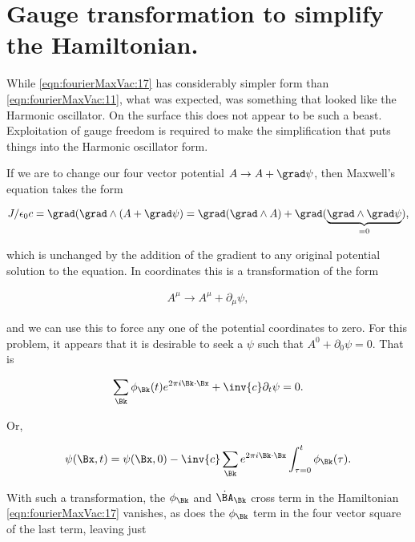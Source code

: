 \section{Gauge transformation to simplify the Hamiltonian.}

While \autoref{eqn:fourierMaxVac:17} has considerably simpler form than \autoref{eqn:fourierMaxVac:11}, what was expected, was something that looked like the Harmonic oscillator.  On the surface this does not appear to be such a beast.  Exploitation of gauge freedom is required to make the simplification that puts things into the Harmonic oscillator form.

If we are to change our four vector potential $A \rightarrow A + \grad \psi$, then Maxwell's equation takes the form

\begin{align}\label{eqn:fourierMaxVac:30}
J/\epsilon_0 c = \grad (\grad \wedge (A + \grad \psi) = \grad (\grad \wedge A) + \grad (\underbrace{\grad \wedge \grad \psi}_{=0}),
\end{align}

which is unchanged by the addition of the gradient to any original potential solution to the equation.  In coordinates this is a transformation of the form

\begin{align}\label{eqn:fourierMaxVac:31}
A^\mu \rightarrow A^\mu + \partial_\mu \psi,
\end{align}

and we can use this to force any one of the potential coordinates to zero.  For this problem, it appears that it is desirable to seek a $\psi$ such that $A^0 + \partial_0 \psi = 0$.  That is

\begin{align}\label{eqn:fourierMaxVac:32}
\sum_\Bk \phi_\Bk(t) e^{2 \pi i \Bk \cdot \Bx} + \inv{c} \partial_t \psi = 0.
\end{align}

Or,

\begin{align}\label{eqn:fourierMaxVac:33}
\psi(\Bx,t) = \psi(\Bx,0) -\inv{c} \sum_\Bk e^{2 \pi i \Bk \cdot \Bx} \int_{\tau=0}^t \phi_\Bk(\tau).
\end{align}

With such a transformation, the $\phi_\Bk$ and $\dot{\BA}_\Bk$ cross term in the Hamiltonian \autoref{eqn:fourierMaxVac:17} vanishes, as does the $\phi_\Bk$ term in the four vector square of the last term, leaving just

